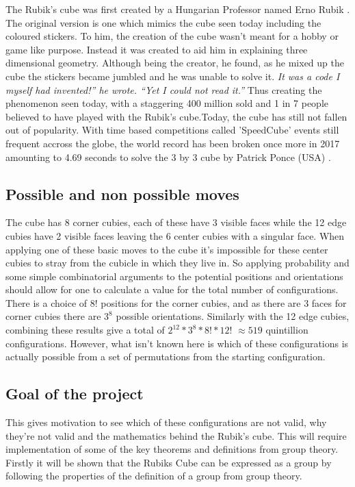 \documentclass{article}
\newcounter{theo}[section]\setcounter{theo}{0}
\newcounter{prop}[section]\setcounter{prop}{0}
\newcounter{lem}[section]\setcounter{lem}{0}
\begin{document}
The Rubik's cube was first created by a Hungarian Professor named Erno Rubik \cite{History}. The original version is one which mimics the cube seen today including the coloured stickers. To him, the creation of the cube wasn't meant for a hobby or game like purpose. Instead it was created to aid him in explaining three dimensional geometry. Although being the creator, he found, as he mixed up the cube the stickers became jumbled and he was unable to solve it.
\textit{It was a code I myself had invented!” he wrote. “Yet I could not read it.”}
Thus creating the phenomenon seen today, with a staggering 400 million sold and 1 in 7 people believed to have played with the Rubik's cube.Today, the cube has still not fallen out of popularity. With time based competitions called 'SpeedCube' events still frequent accross the globe, the world record has been broken once more in 2017 amounting to 4.69 seconds to solve the 3 by 3 cube by Patrick Ponce (USA) \cite{Record}.
\subsection{Possible and non possible moves}

The cube has 8 corner cubies, each of these have 3 visible faces while the 12 edge cubies have 2 visible faces leaving the 6 center cubies with a singular face. When applying one of these basic moves to the cube it's impossible for these center cubies to stray from the cubicle in which they live in.
So applying probability and some simple combinatorial arguments to the potential positions and orientations should allow for one to calculate a value for the total number of configurations.
There is a choice of 8! positions for the corner cubies, and as there are 3 faces for corner cubies there are $3^8$ possible orientations. Similarly with the 12 edge cubies, combining these results give a total of $2^{12} * 3^8 * 8! * 12!$ $\approx 519$ quintillion configurations.
However, what isn't known here is which of these configurations is actually possible from a set of permutations from the starting configuration.

\subsection{Goal of the project}

This gives motivation to see which of these configurations are not valid, why they're not valid and the mathematics behind the Rubik's cube. This will require implementation of some of the key theorems and definitions from group theory. Firstly it will be shown that the Rubiks Cube can be expressed as a group by following the properties of the definition of a group from group theory.
\end{document}
